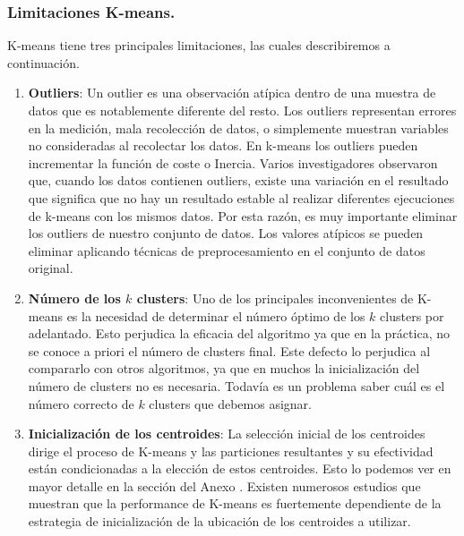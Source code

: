 \documentclass[12pt,a4paper]{article}
\begin{document}
\begin{sloppypar}
\cleardoublepage
\subsubsection{Limitaciones K-means.}

K-means tiene tres principales limitaciones, las cuales describiremos a continuación.

\begin{enumerate}

\item \textbf{Outliers}: Un outlier es una observación atípica dentro de una muestra de datos que es notablemente diferente del resto. Los outliers representan errores en la medición, mala recolección de datos, o simplemente muestran variables no consideradas al recolectar los datos.
En k-means los outliers pueden incrementar la función de coste o Inercia. Varios investigadores observaron que, cuando los datos contienen outliers, existe una variación en el resultado que significa que no hay un resultado estable al realizar diferentes ejecuciones de k-means con los mismos datos\cite{K_means_review}. Por esta razón, es muy importante eliminar los outliers de nuestro conjunto de datos. Los valores atípicos se pueden eliminar aplicando técnicas de preprocesamiento en el conjunto de datos original.

\item \textbf{Número de los $k$ clusters}: Uno de los principales inconvenientes de K-means es la necesidad de determinar el número óptimo de los $k$ clusters por adelantado. Esto perjudica la eficacia del algoritmo ya que en la práctica, no se conoce a priori el número de clusters final. Este defecto lo perjudica al compararlo con otros algoritmos, ya que en muchos la inicialización del número de clusters no es necesaria. Todavía es un problema saber cuál es el número correcto de $k$ clusters que debemos asignar\cite{K_means_review}.

\item \textbf{Inicialización de los centroides}: La selección inicial de los centroides dirige el proceso de K-means y las particiones resultantes y su efectividad están condicionadas a la elección de estos centroides\cite{K_means_experiment}. Esto lo podemos ver en mayor detalle en la sección del Anexo \textit{}. Existen numerosos estudios\cite{K_means_initial_centroids} que muestran que la performance de K-means es fuertemente dependiente de la estrategia de inicialización de la ubicación de los centroides a utilizar.


\end{enumerate}
\end{sloppypar}
\end{document}
